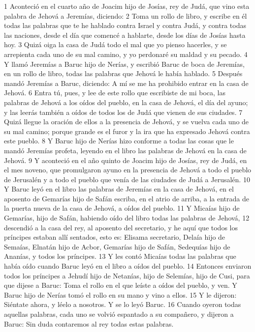 1 Aconteció en el cuarto año de Joacim hijo de Josías, rey de Judá, que vino esta palabra de Jehová a Jeremías, diciendo:
2 Toma un rollo de libro, y escribe en él todas las palabras que te he hablado contra Israel y contra Judá, y contra todas las naciones, desde el día que comencé a hablarte, desde los días de Josías hasta hoy.
3 Quizá oiga la casa de Judá todo el mal que yo pienso hacerles, y se arrepienta cada uno de su mal camino, y yo perdonaré su maldad y su pecado.
4 Y llamó Jeremías a Baruc hijo de Nerías, y escribió Baruc de boca de Jeremías, en un rollo de libro, todas las palabras que Jehová le había hablado.
5 Después mandó Jeremías a Baruc, diciendo: A mí se me ha prohibido entrar en la casa de Jehová.
6 Entra tú, pues, y lee de este rollo que escribiste de mi boca, las palabras de Jehová a los oídos del pueblo, en la casa de Jehová, el día del ayuno; y las leerás también a oídos de todos los de Judá que vienen de sus ciudades.
7 Quizá llegue la oración de ellos a la presencia de Jehová, y se vuelva cada uno de su mal camino; porque grande es el furor y la ira que ha expresado Jehová contra este pueblo.
8 Y Baruc hijo de Nerías hizo conforme a todas las cosas que le mandó Jeremías profeta, leyendo en el libro las palabras de Jehová en la casa de Jehová.
9 Y aconteció en el año quinto de Joacim hijo de Josías, rey de Judá, en el mes noveno, que promulgaron ayuno en la presencia de Jehová a todo el pueblo de Jerusalén y a todo el pueblo que venía de las ciudades de Judá a Jerusalén.
10 Y Baruc leyó en el libro las palabras de Jeremías en la casa de Jehová, en el aposento de Gemarías hijo de Safán escriba, en el atrio de arriba, a la entrada de la puerta nueva de la casa de Jehová, a oídos del pueblo.
11 Y Micaías hijo de Gemarías, hijo de Safán, habiendo oído del libro todas las palabras de Jehová,
12 descendió a la casa del rey, al aposento del secretario, y he aquí que todos los príncipes estaban allí sentados, esto es: Elisama secretario, Delaía hijo de Semaías, Elnatán hijo de Acbor, Gemarías hijo de Safán, Sedequías hijo de Ananías, y todos los príncipes.
13 Y les contó Micaías todas las palabras que había oído cuando Baruc leyó en el libro a oídos del pueblo.
14 Entonces enviaron todos los príncipes a Jehudí hijo de Netanías, hijo de Selemías, hijo de Cusi, para que dijese a Baruc: Toma el rollo en el que leíste a oídos del pueblo, y ven. Y Baruc hijo de Nerías tomó el rollo en su mano y vino a ellos.
15 Y le dijeron: Siéntate ahora, y léelo a nosotros. Y se lo leyó Baruc.
16 Cuando oyeron todas aquellas palabras, cada uno se volvió espantado a su compañero, y dijeron a Baruc: Sin duda contaremos al rey todas estas palabras.
